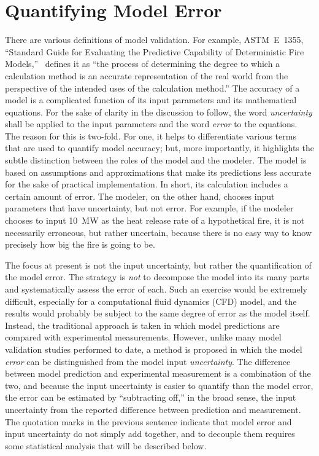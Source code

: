 
\chapter{Quantifying Model Error}

There are various definitions of model validation.
For example, ASTM~E~1355, ``Standard Guide for Evaluating the Predictive Capability of
Deterministic Fire Models,''~\cite{ASTM:E1355} defines it as ``the process of determining the degree to which a calculation method
is an accurate representation of the real world from the perspective of the intended uses of the calculation method.''
The accuracy of a model is a complicated function of its input parameters and its mathematical equations.
For the sake of clarity in the discussion to follow, the word {\em uncertainty} shall be applied to the input parameters and the
word {\em error} to the equations. The reason for this is two-fold. For one,
it helps to differentiate various terms that are used to quantify model accuracy; but, more importantly, it highlights the subtle distinction between the roles of the model
and the modeler. The model is based on assumptions and approximations that make its predictions less
accurate for the sake of practical implementation. In short, its calculation includes a certain amount of error. The modeler, on the other hand, chooses input
parameters that have uncertainty, but not error. For example, if the modeler
chooses to input 10~MW as the heat release rate of a hypothetical fire, it is not necessarily erroneous, but rather uncertain,
because there is no easy way to know precisely how big the fire is going to be.

The focus at present is not the input uncertainty, but rather the quantification of the model error.
The strategy is {\em not} to decompose the model into its many parts and systematically assess
the error of each. Such an exercise would be extremely difficult, especially for a computational fluid dynamics (CFD) model, and the results would probably be subject to the same
degree of error as the model itself. Instead, the traditional approach is taken in which model predictions are compared with experimental measurements. However, unlike many
model validation studies performed to date, a method is proposed in which the model {\em error} can be distinguished from the model input {\em uncertainty}. The difference
between model prediction and experimental measurement is a combination of the two, and because the input
uncertainty is easier to quantify than the model error, the error can be estimated by ``subtracting off,'' in the broad sense, the input uncertainty from the reported
difference between prediction and measurement. The quotation marks in the previous sentence indicate that model error and input uncertainty do not simply add together,
and to decouple them requires some statistical analysis that will be described below.


